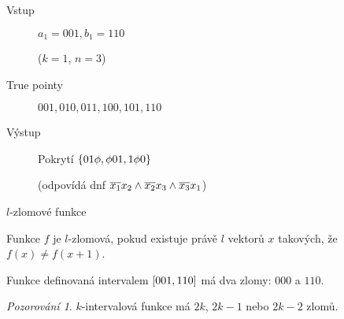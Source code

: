 \documentclass{beamer}
\theoremstyle{remark}
\newtheorem{observation}{Pozorování}
\begin{document}
\begin{frame}

\begin{example}
\begin{description}
\item[Vstup] $a_1 = 001, b_1 = 110$

($k=1$, $n=3$)


\item[True pointy]
$001, 010, 011, 100, 101, 110$

\item[Výstup]
Pokrytí $\{01 \phi, \phi 01, 1 \phi 0\}$

(odpovídá \acrshort{dnf}
$\overline{x_1} x_2
\wedge
\overline{x_2} x_3
\wedge \overline{x_3} x_1$)
\end{description}
\end{example}

\begin{figure}[h]
\centering

\end{figure}

\end{frame}

\begin{frame}{$l$-zlomové funkce}
\begin{definition}
Funkce $f$ je $l$-zlomová,
pokud existuje právě $l$ vektorů $x$ takových,
že $f(x) \neq f(x+1)$.
\end{definition}

\begin{example}
Funkce definovaná intervalem $[001, 110]$ má dva zlomy: $000$ a $110$.

\end{example}

\begin{observation}
$k$-intervalová funkce má $2k$, $2k-1$ nebo $2k-2$ zlomů.
\end{observation}
\end{frame}
\end{document}
